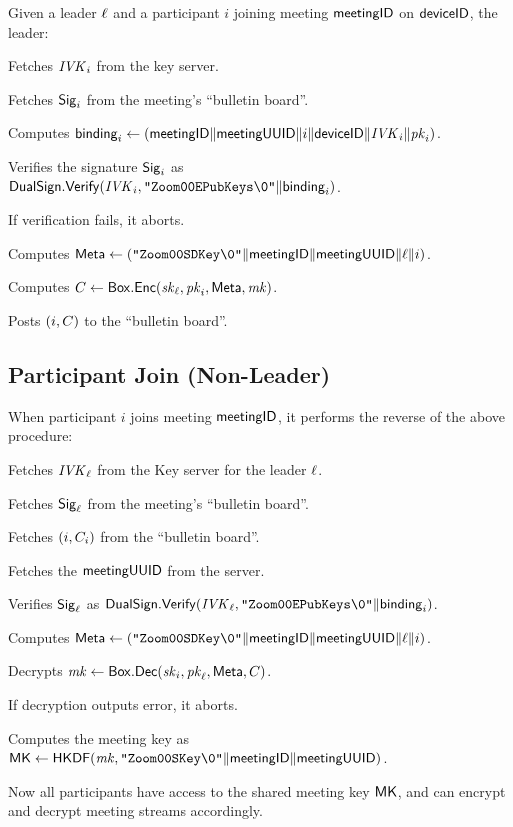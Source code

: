 Given a leader $\ell$ and a participant $i$ joining meeting ${\sf meetingID}$ on ${\sf deviceID}$, the leader:

\begingroup
\RaggedRight
\begin{enumerate*}
\item Fetches $\mathit{IVK}_i$ from the key server.
\item Fetches ${\sf Sig}_i$ from the meeting's ``bulletin board''.
\item Computes ${\sf binding}_i \leftarrow \left( {\sf meetingID} \| \allowbreak {\sf meetingUUID} \| i \allowbreak \| {\sf deviceID} \| \mathit{IVK}_i \| \allowbreak \mathit{pk}_i \right)$.
\item Verifies the signature ${\sf Sig}_i$ as ${\sf DualSign}.\mathsf{Verify}(\mathit{IVK}_i, \allowbreak \texttt{"Zoom00EPubKeys\textbackslash0"} \| \allowbreak {\sf binding}_i)$.
\item If verification fails, it aborts.
\item Computes ${\sf Meta} \leftarrow \left( \texttt{"Zoom00SDKey\textbackslash0"}  \| {\sf meetingID} \| \allowbreak {\sf meetingUUID} \| \allowbreak \ell \| i \right)$.
\item Computes $C \leftarrow {\sf Box}.\mathsf{Enc}(\mathit{sk}_\ell, \mathit{pk}_i, {\sf Meta}, \mathit{mk})$.
   \label{participantJoinRekeyStart}
\item Posts $(i, C)$ to the ``bulletin board''.
   \label{participantJoinRekeyEnd}
\end{enumerate*}
\endgroup

\subsection{Participant Join (Non-Leader)}

When participant $i$ joins meeting ${\sf meetingID}$, it performs the reverse of the above procedure:

\begingroup
\RaggedRight
\begin{enumerate*}
\item Fetches $\mathit{IVK}_{\ell}$ from the Key server for the leader $\ell$.
\item Fetches ${\sf Sig}_{\ell}$ from the meeting's ``bulletin board''.
\item Fetches $(i, C_i)$ from the ``bulletin board''.
\item Fetches the ${\sf meetingUUID}$ from the server.
\item Verifies ${\sf Sig}_{\ell}$ as ${\sf DualSign}.\mathsf{Verify}(\mathit{IVK}_{\ell}, \texttt{"Zoom00EPubKeys\textbackslash0"} \|\allowbreak {\sf binding}_i)$.
\item Computes ${\sf Meta} \leftarrow \left(\texttt{"Zoom00SDKey\textbackslash0"} \| \allowbreak {\sf meetingID} \| \allowbreak {\sf meetingUUID} \| \allowbreak \ell \| i \right)$.
\item Decrypts $\mathit{mk} \leftarrow {\sf Box}.\mathsf{Dec}(\mathit{sk}_{i}, \mathit{pk}_{\ell}, {\sf Meta} \allowbreak, C)$.
   \label{participantJoinRekeyNonLeaderStart}
\item If decryption outputs {\sf error}, it aborts.
\item Computes the meeting key as ${\sf MK} \leftarrow {\sf HKDF}(\mathit{mk}, \texttt{"Zoom00SKey\textbackslash0"} \| \allowbreak {\sf meetingID} \|  \allowbreak {\sf meetingUUID})$.
   \label{participantJoinRekeyNonLeaderEnd}
\end{enumerate*}
\endgroup

Now all participants have access to the shared meeting key ${\sf MK}$, and can encrypt and decrypt meeting streams accordingly.
